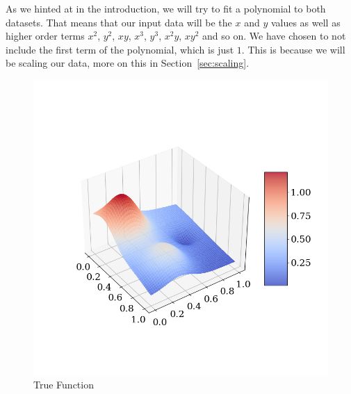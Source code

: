 \documentclass[twoside,11pt]{report}
\begin{document}
As we hinted at in the introduction, we will try to fit a polynomial to both datasets. That means that our input data will be 
the $x$ and $y$ values as well as higher order terms $x^2$, $y^2$, $xy$, $x^3$, $y^3$, $x^2y$, $xy^2$ and so on.
We have chosen to not include the first term of the polynomial, which is just $1$. This is because we will be scaling our data,
more on this in Section~\ref{sec:scaling}.\\
\begin{figure}[h]
\begin{minipage}[!t]{.48\linewidth}
    \begin{center}
        \includegraphics[width=1.1\textwidth]{../runsAndAdditions/trueFunction.png}
        \caption{True Function}\label{fig:truefunction}
\end{center}
\end{minipage}
\hspace{2mm}
\begin{minipage}[!t]{.48\linewidth}
    \begin{center}

\end{center}
\end{minipage}
\end{figure}
\end{document}
